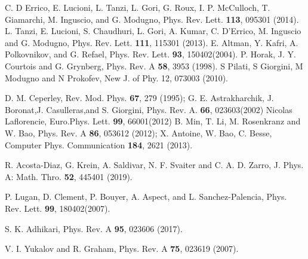 \documentclass[amsmath,amssymb,lengthcheck,aps,prl] {revtex4}
\begin{document}
\begin{thebibliography}{50}
 C. D Errico, E. Lucioni, L. Tanzi, L. Gori, G. Roux, I. P. McCulloch, T. Giamarchi, M. Inguscio, and G. Modugno, Phys. Rev. Lett. {\bf 113}, 095301 (2014). %
 L. Tanzi, E. Lucioni, S. Chaudhuri, L. Gori, A. Kumar, C. D’Errico, M. Inguscio and G. Modugno, Phys. Rev. Lett. {\bf 111}, 115301 (2013). %
 E. Altman, Y. Kafri, A. Polkovnikov, and G. Refael, Phys. Rev. Lett. {\bf 93}, 150402(2004). %
 P. Horak, J. Y. Courtois and G. Grynberg,  Phys. Rev. A {\bf 58}, 3953 (1998). %
 S Pilati, S Giorgini, M Modugno and N Prokofev, New J. of Phy. 12, 073003 (2010). %


 D. M. Ceperley, Rev. Mod. Phys. {\bf 67}, 279 (1995); G. E. Astrakharchik, J. Boronat,J. Casulleras,and S. Giorgini, Phys. Rev. A. {\bf 66}, 023603(2002)
 Nicolas Laflorencie, Euro.Phys. Lett. {\bf 99}, 66001(2012)
 B. Min, T. Li, M. Rosenkranz and W. Bao, Phys. Rev. A {\bf 86}, 053612 (2012); %
 X. Antoine, W. Bao, C. Besse, Computer Phys. Communication {\bf 184}, 2621 (2013). %

 R. Acosta-Diaz, G. Krein, A. Saldivar, N. F. Svaiter and C. A. D. Zarro, J. Phys. A: Math. Thro. {\bf 52}, 445401 (2019). %


 P. Lugan, D. Clement, P. Bouyer, A. Aspect, and L. Sanchez-Palencia, Phys. Rev. Lett. {\bf 99}, 180402(2007). %




 S. K. Adhikari, Phys. Rev. A {\bf 95}, 023606 (2017).


  V. I. Yukalov and R. Graham, Phys. Rev. A {\bf 75}, 023619 (2007). %






\end{thebibliography}
\end{document}

